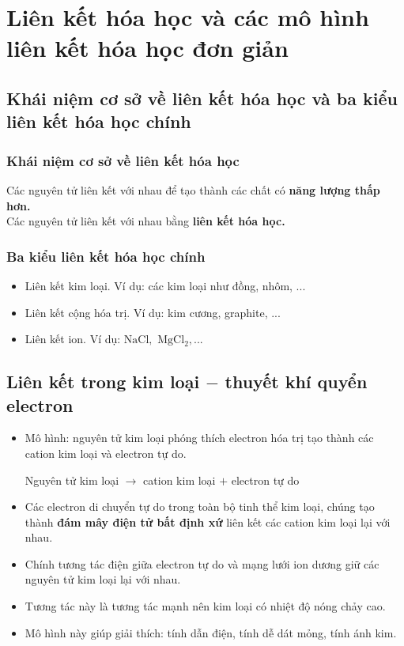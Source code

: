 \chapter{Liên kết hóa học và các mô hình liên kết hóa học đơn giản}
\section{Khái niệm cơ sở về liên kết hóa học và ba kiểu liên kết hóa học chính}
\subsection{Khái niệm cơ sở về liên kết hóa học}
Các nguyên tử liên kết với nhau để tạo thành các chất có \textbf{năng lượng thấp hơn.}\\
Các nguyên tử liên kết với nhau bằng \textbf{liên kết hóa học.}
\subsection{Ba kiểu liên kết hóa học chính}
\begin{itemize}
\item Liên kết kim loại. Ví dụ: các kim loại như đồng, nhôm, ...
\item Liên kết cộng hóa trị. Ví dụ: kim cương, graphite, ...
\item Liên kết ion. Ví dụ: $\mathrm{NaCl},$ $\mathrm{MgCl_2}, ...$
\end{itemize}
\section{Liên kết trong kim loại $-$ thuyết khí quyển electron}
\begin{itemize}
\item Mô hình: nguyên tử kim loại phóng thích electron hóa trị tạo thành các cation kim loại và electron tự do.\\
\centerline{Nguyên tử kim loại $\to$ cation kim loại $+$ electron tự do}
\item Các electron di chuyển tự do trong toàn bộ tinh thể kim loại, chúng tạo thành \textbf{đám mây điện tử bất định xứ} liên kết các cation kim loại lại với nhau.
\item Chính tương tác điện giữa electron tự do và mạng lưới ion dương giữ các nguyên tử kim loại lại với nhau.
\item Tương tác này là tương tác mạnh nên kim loại có nhiệt độ nóng chảy cao.
\item Mô hình này giúp giải thích: tính dẫn điện, tính dễ dát mỏng, tính ánh kim.
\end{itemize}
